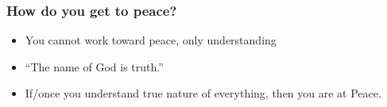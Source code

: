 \begin{frame}[fragile]\frametitle{How do you get to peace?}

	\begin{itemize}
	\item You cannot work toward peace, only understanding
	\item ``The name of God is truth.''
	\item If/once you understand true nature of everything, then you are at Peace.
	\end{itemize}

\end{frame}